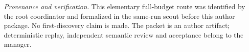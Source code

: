 \documentclass[11pt]{article}
\begin{document}
\textit{Provenance and verification.} This elementary full-budget route
was identified by the root coordinator and formalized in the same-run
scout before this author package. No first-discovery claim is made.
The packet is an author artifact; deterministic replay, independent
semantic review and acceptance belong to the manager.
\end{document}
